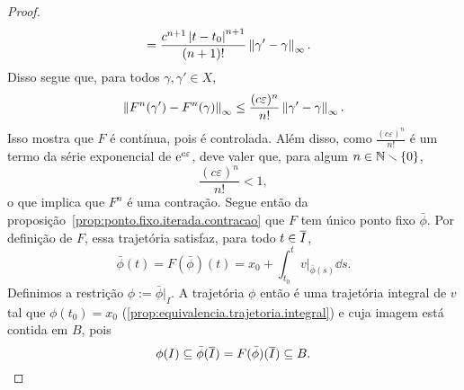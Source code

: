 \begin{proof}
\begin{align*}
		&= \frac{c^{n+1}\left\vert{t-t_0}\right\vert^{n+1}}{(n+1)!} \left\Vert{\gamma' - \gamma}\right\Vert_{\infty}.
	\end{align*}
Disso segue que, para todos $\gamma, \gamma' \in X$,
	\begin{equation*}
	\left\Vert{F^n(\gamma') - F^n(\gamma)}\right\Vert_{\infty} \leq \frac{(c\varepsilon)^n}{n!} \left\Vert{\gamma' - \gamma}\right\Vert_{\infty}.
	\end{equation*}
Isso mostra que $F$ é contínua, pois é controlada. Além disso, como $\frac{(c\varepsilon)^n}{n!}$ é um termo da série exponencial de $\mathrm{e}^{c\varepsilon}$, deve valer que, para algum $n \in \mathbb{N} \smallsetminus \{0\}$,
	\begin{equation*}
	\frac{(c\varepsilon)^n}{n!} < 1,
	\end{equation*}
o que implica que $F^n$ é uma contração. Segue então da proposição~\ref{prop:ponto.fixo.iterada.contracao} que $F$ tem único ponto fixo $\bar\phi$. Por definição de $F$, essa trajetória satisfaz, para todo $t \in \overline{I}$,
	\begin{equation*}
	\bar\phi(t) = F(\bar\phi)(t) = x_0 + \int_{t_0}^{t} v|_{\bar\phi(s)} \dd s.
	\end{equation*}
Definimos a restrição $\phi := \bar\phi|_{I}$. A trajetória $\phi$ então %
é uma trajetória integral de $v$ tal que $\phi(t_0) = x_0$ (\ref{prop:equivalencia.trajetoria.integral}) e cuja imagem está contida em $B$, pois %
	\begin{equation*}
	\phi(I) \subseteq \bar\phi(\overline{I}) = F(\bar\phi)(\overline{I}) \subseteq B.
	\end{equation*}


\end{proof}
